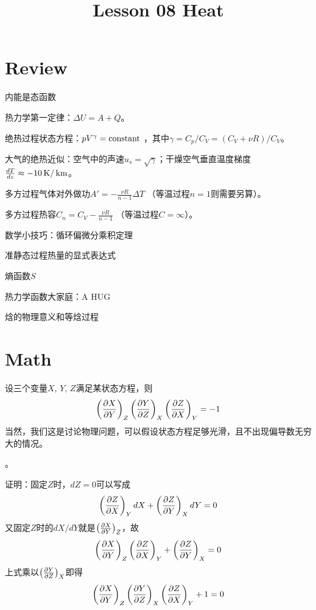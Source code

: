 \documentclass[CJK]{beamer}
\title{Lesson 08 Heat}
\author{}
\date{}
\begin{document}

\section{Review}

\begin{frame}
\bch
\bitem
\item{内能是态函数}
\item{热力学第一定律：$\Delta U = A + Q$。}
\item{绝热过程状态方程：$pV^\gamma = \mathrm{constant}$ ，其中$\gamma = C_p/C_V = (C_V + \nu R)/C_V$。}
\item{大气的绝热近似：空气中的声速$u_s =\sqrt{\gamma}$；干燥空气垂直温度梯度$\frac{dT}{dz} \approx -10 \,\mathrm{K}/\,\mathrm{km}$。}
\item{多方过程气体对外做功$A' = -\frac{\nu R}{n-1}\Delta T$ （等温过程$n=1$则需要另算）。}
\item{多方过程热容$C_n =C_V -\frac{\nu R}{n-1}$ （等温过程$C = \infty$）。}
\eitem
\ech
\end{frame}


\begin{frame}
\bch
\bitem
\item{数学小技巧：循环偏微分乘积定理}
\item{准静态过程热量的显式表达式}
\item{熵函数$S$}
\item{热力学函数大家庭：A HUG}
\item{焓的物理意义和等焓过程}
\eitem
\ech
\end{frame}

\section{Math}

\begin{frame}
\bch
设三个变量$X$, $Y$, $Z$满足某状态方程，则
{\blue 
$$\left(\frac{\partial X}{\partial Y}\right)_{Z}  \left(\frac{\partial Y}{\partial Z}\right)_{X} \left(\frac{\partial Z}{\partial X}\right)_{Y} = -1$$
}
当然，我们这是讨论物理问题，可以假设状态方程足够光滑，且不出现偏导数无穷大的情况。

\skipline

。
\ech
\end{frame}


\begin{frame}
\bch
{\scriptsize
证明：固定$Z$时，$dZ = 0$可以写成
$$\left(\frac{\partial Z}{\partial X}\right)_{Y} dX + \left(\frac{\partial Z}{\partial Y}\right)_{X} dY = 0$$
又固定$Z$时的$dX/dY$就是$\left(\frac{\partial X}{\partial Y}\right)_{Z}$，故
$$\left(\frac{\partial X}{\partial Y}\right)_{Z} \left(\frac{\partial Z}{\partial X}\right)_{Y} + \left(\frac{\partial Z}{\partial Y}\right)_{X} = 0$$
上式乘以$\left(\frac{\partial Y}{\partial Z}\right)_{X}$即得
$$\left(\frac{\partial X}{\partial Y}\right)_{Z} \left(\frac{\partial Y}{\partial Z}\right)_{X} \left(\frac{\partial Z}{\partial X}\right)_{Y} + 1 = 0$$
}
\ech
\end{frame}
\end{document}
